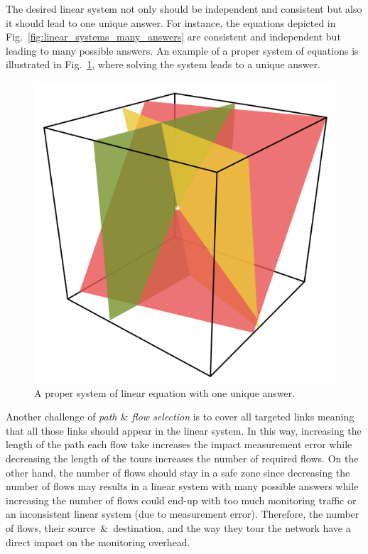 \documentclass[10pt, journal, letterpaper]{IEEEtran}
\begin{document}
The desired linear system not only should be independent and consistent but also it should lead to one unique answer. For instance, the equations depicted in Fig.~\ref{fig:linear_systems_many_answers} are consistent and independent but leading to many possible answers. An example of a proper system of equations is illustrated in Fig.~\ref{fig:linear_system_perfect}, where solving the system leads to a unique answer.
\begin{figure}
    \centering
    \includegraphics[width=0.49\columnwidth]{img/perfectsolution.png}
    \caption{A proper system of linear equation with one unique answer.}
    \label{fig:linear_system_perfect}
\end{figure}
Another challenge of \textit{path $\&$ flow selection} is to cover all targeted links meaning that all those links should appear in the linear system. In this way, increasing the length of the path each flow take increases the impact measurement error while decreasing the length of the tours increases the number of required flows. On the other hand, the number of flows should stay in a safe zone since decreasing the number of flows may results in a linear system with many possible answers while increasing the number of flows could end-up with too much monitoring traffic or an inconsistent linear system (due to measurement error). Therefore, the number of flows, their source~$\&$~destination, and the way they tour the network have a direct impact on the monitoring overhead.
\end{document}
